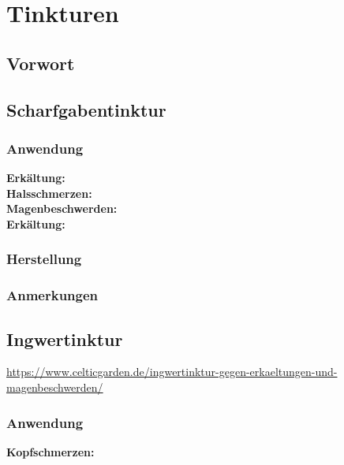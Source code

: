 \chapter{Tinkturen}

\section{Vorwort}

\lipsum[1-5]
\newpage


\section{Scharfgabentinktur}

\subsection{Anwendung}

\textbf{Erkältung:} \\ 

\textbf{Halsschmerzen:} \\ 

\textbf{Magenbeschwerden:} \\ 

\textbf{Erkältung:} \\ 

\subsection{Herstellung}

\subsection{Anmerkungen}






\section{Ingwertinktur}

\url{https://www.celticgarden.de/ingwertinktur-gegen-erkaeltungen-und-magenbeschwerden/}


\subsection{Anwendung}

\textbf{Kopfschmerzen:} \\ 


